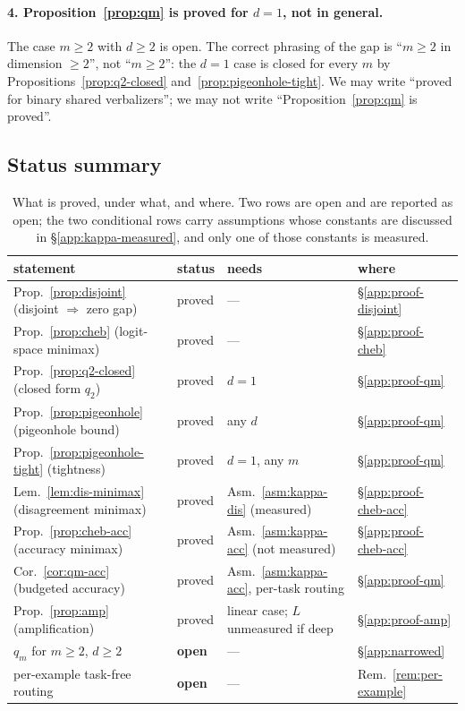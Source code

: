 \paragraph{4. Proposition~\ref{prop:qm} is proved for $d=1$, not in general.}
The case $m\ge2$ with $d\ge2$ is open. The correct phrasing of the gap is ``$m\ge2$
in dimension $\ge2$'', not ``$m\ge2$'': the $d=1$ case is closed for every $m$ by
Propositions~\ref{prop:q2-closed} and~\ref{prop:pigeonhole-tight}. We may write
``proved for binary shared verbalizers''; we may not write
``Proposition~\ref{prop:qm} is proved''.

\subsection{Status summary}
\label{app:status}

\begin{table}[h]
\centering
\small
\begin{tabular}{llll}
\toprule
statement & status & needs & where \\
\midrule
Prop.~\ref{prop:disjoint} (disjoint $\Rightarrow$ zero gap) & proved & --- & \S\ref{app:proof-disjoint} \\
Prop.~\ref{prop:cheb} (logit-space minimax) & proved & --- & \S\ref{app:proof-cheb} \\
Prop.~\ref{prop:q2-closed} (closed form $q_2$) & proved & $d=1$ & \S\ref{app:proof-qm} \\
Prop.~\ref{prop:pigeonhole} (pigeonhole bound) & proved & any $d$ & \S\ref{app:proof-qm} \\
Prop.~\ref{prop:pigeonhole-tight} (tightness) & proved & $d=1$, any $m$ & \S\ref{app:proof-qm} \\
Lem.~\ref{lem:dis-minimax} (disagreement minimax) & proved & Asm.~\ref{asm:kappa-dis} (measured) & \S\ref{app:proof-cheb-acc} \\
Prop.~\ref{prop:cheb-acc} (accuracy minimax) & proved & Asm.~\ref{asm:kappa-acc} (not measured) & \S\ref{app:proof-cheb-acc} \\
Cor.~\ref{cor:qm-acc} (budgeted accuracy) & proved & Asm.~\ref{asm:kappa-acc}, per-task routing & \S\ref{app:proof-qm} \\
Prop.~\ref{prop:amp} (amplification) & proved & linear case; $L$ unmeasured if deep & \S\ref{app:proof-amp} \\
$q_m$ for $m\ge2$, $d\ge2$ & \textbf{open} & --- & \S\ref{app:narrowed} \\
per-example task-free routing & \textbf{open} & --- & Rem.~\ref{rem:per-example} \\
\bottomrule
\end{tabular}
\caption{What is proved, under what, and where. Two rows are open and are reported as
open; the two conditional rows carry assumptions whose constants are discussed in
\S\ref{app:kappa-measured}, and only one of those constants is measured.}
\label{tab:proof-status}
\end{table}
